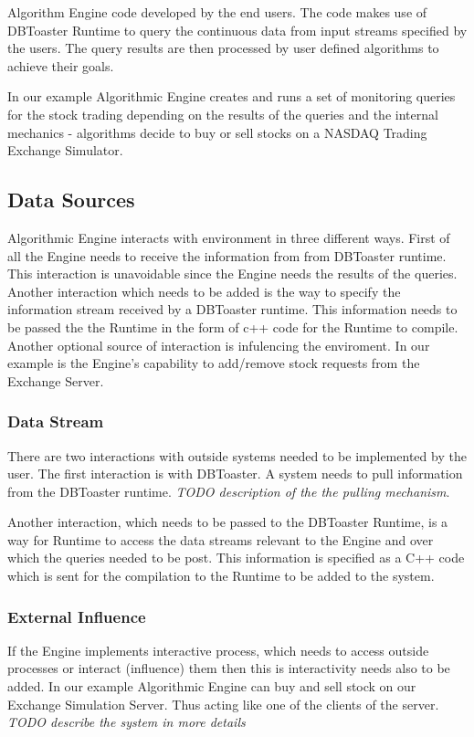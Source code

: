 \documentclass[11pt]{article}
\begin{document}
Algorithm Engine code developed by the end users. The code makes use of DBToaster Runtime to query the continuous data from input streams specified by the users. The query results are then processed by user defined algorithms to achieve their goals. 

In our example Algorithmic Engine creates and runs a set of monitoring queries for the stock trading depending on the results of the queries and the internal mechanics - algorithms decide to buy or sell stocks on a NASDAQ Trading Exchange Simulator.

\subsection{Data Sources}

Algorithmic Engine interacts with environment in three different ways. First of all the Engine needs to receive  the information from from DBToaster runtime. This interaction is unavoidable since the Engine needs the results of the queries. Another interaction which needs to be added is the way to specify the information stream received by a DBToaster runtime. This information needs to be passed the the Runtime in the form of c++ code for the Runtime to compile. Another optional source of interaction is infulencing the enviroment. In our example is the Engine's capability to add/remove stock requests from the Exchange Server. 

\subsubsection{Data Stream}

There are two interactions with outside systems needed to be implemented by the user. The first interaction is with DBToaster. A system needs to pull information from the DBToaster runtime. \emph{TODO description of the the pulling mechanism}.

Another interaction, which needs to be passed to the DBToaster Runtime, is a way for Runtime to access the data streams relevant to the Engine and over which the queries needed to be post. This information is specified as a C++ code which is sent for the compilation to the Runtime to be added to the system.

\subsubsection{External Influence}

If the Engine implements interactive process, which needs to access outside processes or interact (influence) them then this is interactivity needs also to be added. In our example Algorithmic Engine can buy and sell stock on our Exchange Simulation Server. Thus acting like one of the clients of the server. \emph{TODO describe the system in more details}
\end{document}
